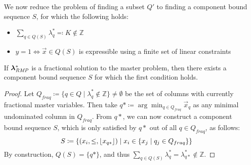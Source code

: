 We now reduce the problem of finding a subset $Q'$ to finding a component bound sequence $S$, for which the following holds:
\begin{itemize}
\item $\sum_{q \in Q(S)} \lambda_q^* \eqqcolon K \not\in \mathbb{Z}$
\item $y = 1 \Leftrightarrow \vec{x} \in Q(S)$ is expressible using a finite set of linear constraints
\end{itemize}

\begin{proposition}
If ${\bm{\lambda}}^*_{\textit{RMP}}{}$ is a fractional solution to the master problem, then there exists a component bound sequence $S$ for which the first condition holds.
\end{proposition}

\begin{proof}\label{pr:cg_bp_bp}
Let $Q_{fraq} \coloneqq \{ q \in Q \mid \lambda_q^* \not\in \mathbb{Z} \} \neq \emptyset$ be the set of columns with currently fractional master variables. Then take $q* \coloneqq \arg\min_{q \in Q_{fraq}} \vec{x}_q$ as any minimal undominated column in $Q_{fraq}$.
From $q*$, we can now construct a component bound sequence $S$, which is only satisfied by $q*$ out of all $q \in Q_{fraq}$, as follows:
\begin{equation}
S \coloneqq \left\{ \left( x_i, \leq, \lfloor x_{q*}\rfloor \right) \mid x_i \in \{x_j \mid q_j \in Q_{fraq}\} \right\}
\end{equation}
By construction, $Q(S) = \{q*\}$, and thus $\sum_{q \in Q(S)} \lambda_q^* = \lambda_{q*}^* \not\in \mathbb{Z}$.
\end{proof}

